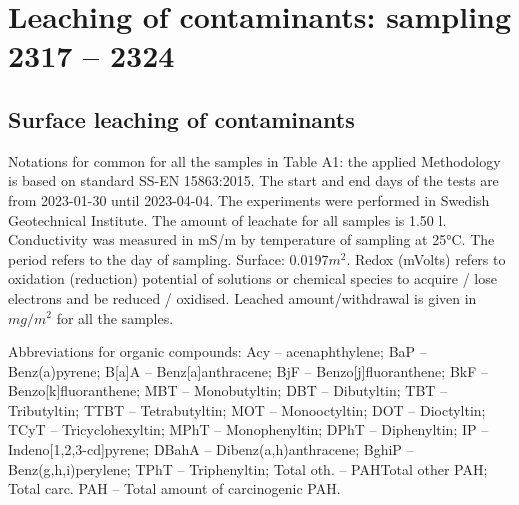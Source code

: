 \documentclass[algorithms,article,submit,pdftex,moreauthors]{Definitions/mdpi}
\begin{document}
\appendixstart
\appendix
\section[\appendixname~\thesection]{Leaching of contaminants: sampling 2317 -- 2324}
\subsection[\appendixname~\thesubsection]{Surface leaching of contaminants}

Notations for common for all the samples in Table A1: the applied Methodology is based on standard SS-EN 15863:2015. The start and end days of the tests are from 2023-01-30 until 2023-04-04. The experiments were performed in Swedish Geotechnical Institute. The amount of leachate for all samples is 1.50 l. Conductivity was measured in mS/m by temperature of sampling at 25°C. The period refers to the day of sampling. Surface: $0.0197 m^2$. Redox (mVolts) refers to oxidation (reduction) potential of solutions or chemical species to acquire / lose electrons and be reduced / oxidised. Leached amount/withdrawal is given in $mg/m^2$ for all the samples. 

Abbreviations for organic compounds: Acy -- acenaphthylene; BaP -- Benz(a)pyrene; B[a]A -- Benz[a]anthracene; BjF -- Benzo[j]fluoranthene; BkF -- Benzo[k]fluoranthene; MBT -- Monobutyltin; DBT -- Dibutyltin; TBT -- Tributyltin; TTBT -- Tetrabutyltin; MOT -- Monooctyltin; DOT -- Dioctyltin; TCyT -- Tricyclohexyltin; MPhT -- Monophenyltin; DPhT -- Diphenyltin; IP -- Indeno[1,2,3-cd]pyrene; DBahA -- Dibenz(a,h)anthracene; BghiP -- Benz(g,h,i)perylene; TPhT -- Triphenyltin; Total oth. --  PAHTotal other PAH; Total carc. PAH -- Total amount of carcinogenic PAH. 
\end{document}
